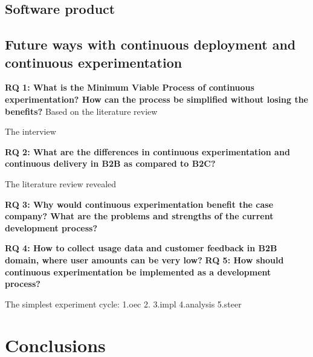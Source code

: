 \documentclass[english]{tktltiki2}
\theoremstyle{definition}
\theoremstyle{remark}
\begin{document}
\subsection{Software product}

\subsection{Future ways with continuous deployment and continuous experimentation}

\textbf{RQ 1: What is the Minimum Viable Process of continuous experimentation? How can the process be simplified without losing the benefits?}
Based on the literature review

The interview

\textbf{RQ 2: What are the differences in continuous experimentation and continuous delivery in B2B as compared to B2C?}

The literature review revealed

\textbf{RQ 3: Why would continuous experimentation benefit the case company? What are the problems and strengths of the current development process?}


\textbf{RQ 4: How to collect usage data and customer feedback in B2B domain, where user amounts can be very low?}
\textbf{RQ 5: How should continuous experimentation be implemented as a development process?}


The simplest experiment cycle:
1.oec
2.
3.impl
4.analysis
5.steer

\section{Conclusions}

%
%
% 
%








% 
\end{document}
